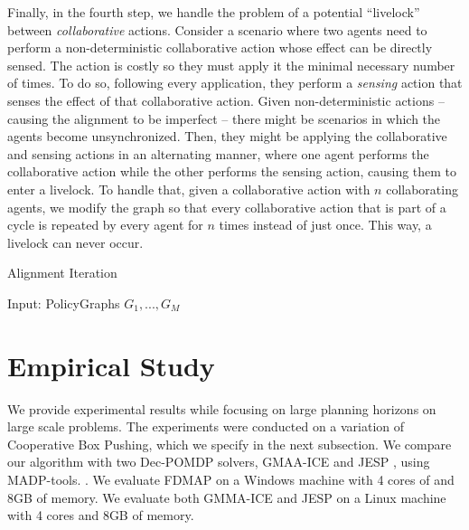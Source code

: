 \documentclass[letterpaper]{article} %
\begin{document}
Finally, in the fourth step, we handle the problem of a potential ``livelock''
between \emph{collaborative} actions. Consider a scenario where two agents need to perform a non-deterministic collaborative action whose effect can be directly sensed. The action is costly so they must apply it the minimal necessary number of times. To do so, following every application, they perform a \emph{sensing} action that senses the effect of that collaborative action.
Given non-deterministic actions -- causing the alignment to be imperfect -- there might be scenarios in which the agents become unsynchronized. Then, they might be applying the collaborative and sensing actions in an alternating manner, where one agent performs the collaborative action while the other performs the sensing action, causing them to enter a livelock. To handle that, given a collaborative action with $n$ collaborating agents, we modify the graph so that every collaborative action that is part of a cycle is repeated by every agent for $n$ times instead of just once. This way, a livelock can never occur.

\begin{algorithm}
\caption{Alignment Iteration}
\begin{algorithmic}[tbph]
\State Input: PolicyGraphs $G_1, ..., G_M$
	\EndFor
	\EndIf
	\EndWhile
\EndFor
{}
\end{algorithmic}
\end{algorithm}

\section{Empirical Study}
We provide experimental results while focusing on large planning horizons on large scale problems.
The experiments were conducted on a variation of Cooperative Box Pushing, which we specify in the next subsection.
We compare our algorithm with two Dec-POMDP solvers, GMAA-ICE \cite{} and JESP \cite{}, using MADP-tools. \cite{}.
We evaluate FDMAP on a Windows machine with 4 cores of and 8GB of memory.
We evaluate both GMMA-ICE and JESP on a Linux machine with 4 cores and 8GB of memory.
\end{document}
